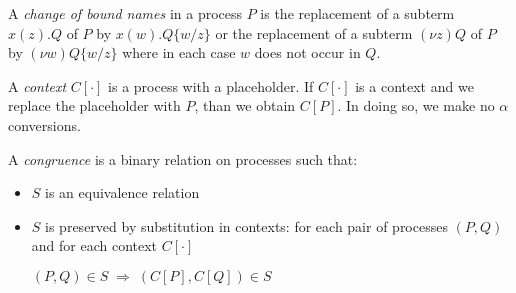 \begin{definition}
  A \emph{change of bound names} in a process $P$ is the replacement of a subterm $x(z).Q$ of $P$ by $x(w).Q\{w/z\}$ or the replacement of a subterm $(\nu z)Q$ of $P$ by $(\nu w)Q\{w/z\}$ where in each case $w$ does not occur in $Q$.
\end{definition}


\begin{definition}
  A \emph{context} $C[\cdot]$ is a process with a placeholder. If $C[\cdot]$ is a context and we replace the placeholder with $P$, than we obtain $C[P]$. In doing so, we make no $\alpha$ conversions.
\end{definition}


\begin{definition}
  A \emph{congruence} is a binary relation on processes such that:
  \begin{itemize}
    \item 
      $S$ is an equivalence relation
    \item 
      $S$ is preserved by substitution in contexts: for each pair of processes $(P, Q)$ and for each context $C[\cdot]$
      \begin{center}
	$(P,Q)\in S\; \Rightarrow\; (C[P], C[Q])\in S$
      \end{center}
  \end{itemize}
\end{definition}

